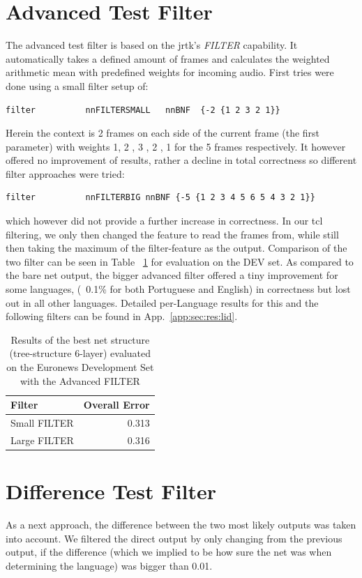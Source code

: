 \section{Advanced Test Filter}
\label{sec:eval:advanced}
The advanced test filter is based on the jrtk's \textit{FILTER} capability. It automatically takes a defined amount of frames and calculates the weighted arithmetic mean with predefined weights for incoming audio. First tries were done using a small filter setup of:
\begin{verbatim}
filter          nnFILTERSMALL   nnBNF  {-2 {1 2 3 2 1}}
\end{verbatim}  Herein the context is 2 frames on each side of the current frame (the first parameter) with weights 1, 2 , 3 , 2 , 1 for the 5 frames respectively.  It however offered no improvement of results, rather a decline in total correctness so different filter approaches were tried:
\begin{verbatim}
filter          nnFILTERBIG nnBNF {-5 {1 2 3 4 5 6 5 4 3 2 1}}
\end{verbatim}
which however did not provide a further increase in correctness. In our tcl filtering, we only then changed the feature to read the frames from, while still then taking the maximum of the filter-feature as the output. Comparison of the two filter can be seen  in Table ~\ref{tab:evalAdvanced} for evaluation on the DEV set. As compared to the bare net output, the bigger advanced filter offered a tiny improvement for some languages, (~0.1\% for both Portuguese and English) in correctness but lost out in all other languages. Detailed per-Language results for this and the following filters can be found in App.~\ref{app:sec:res:lid}.

\begin{table}[h!]
\centering
\caption{Results of the best net structure (tree-structure 6-layer) evaluated on the Euronews Development Set with the Advanced FILTER}
\label{tab:evalAdvanced}
\begin{tabular}{| l | r |}
	\hline
	\textbf{Filter} & \textbf{Overall Error}  \\
	\hline
	Small FILTER  &  0.313 \\
	\hline
	Large FILTER & 0.316 \\
	\hline
\end{tabular}
\end{table}


\section{Difference Test Filter}
\label{sec:eval:variance}
As a next approach, the difference between the two most likely outputs was taken into account. We filtered the direct output by only changing from the previous output, if the difference (which we implied to be how sure the net was when determining the language) was bigger than 0.01. 

